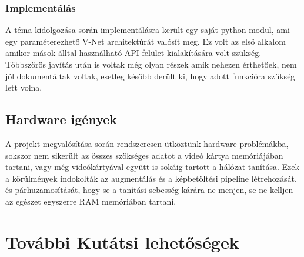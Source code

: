 \documentclass[a4paper]{article}
\begin{document}
	\subsubsection*{Implementálás}
	A téma kidolgozása során implementálásra került egy saját python modul, ami egy paraméterezhető V-Net architektúrát valósít meg. Ez volt az első alkalom amikor mások álltal használható API felület kialakítására volt szükség. Többszörös javítás után is voltak még olyan részek amik nehezen érthetőek, nem jól dokumentáltak voltak, esetleg később derült ki, hogy adott funkcióra szükség lett volna.
	\subsection*{Hardware igények}
	A projekt megvalósítása során rendszeresen ütköztünk hardware problémákba, sokszor nem sikerült az összes szökséges adatot a videó kártya memóriájában tartani, vagy még videókártyával együtt is sokáig tartott a hálózat tanítása. Ezek a körülmények indokolták az augmentálás és a képbetöltési pipeline létrehozását, és párhuzamosítását, hogy se a tanítási sebesség kárára ne menjen, se ne kelljen az egészet egyszerre RAM memóriában tartani.
	\section{További Kutátsi lehetőségek}
	{}
	
	
\end{document}
